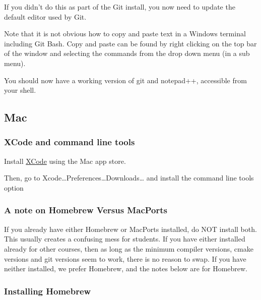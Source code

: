 If you didn't do this as part of the Git install, you now need to update
the default editor used by Git.

\begin{Shaded}
\begin{Highlighting}[]
 
\end{Highlighting}
\end{Shaded}

Note that it is not obvious how to copy and paste text in a Windows
terminal including Git Bash. Copy and paste can be found by right
clicking on the top bar of the window and selecting the commands from
the drop down menu (in a sub menu).

You should now have a working version of git and notepad++, accessible
from your shell.

\subsection{Mac}\label{mac}

\subsubsection{XCode and command line
tools}\label{xcode-and-command-line-tools}

Install \href{https://itunes.apple.com/us/app/xcode/id497799835}{XCode}
using the Mac app store.

Then, go to Xcode\ldots{}Preferences\ldots{}Downloads\ldots{} and
install the command line tools option

\subsubsection{A note on Homebrew Versus
MacPorts}\label{a-note-on-homebrew-versus-macports}

If you already have either Homebrew or MacPorts installed, do NOT
install both. This usually creates a confusing mess for students. If you
have either installed already for other courses, then as long as the
minimum compiler versions, cmake versions and git versions seem to work,
there is no reason to swap. If you have neither installed, we prefer
Homebrew, and the notes below are for Homebrew.

\subsubsection{Installing Homebrew}\label{installing-homebrew}

